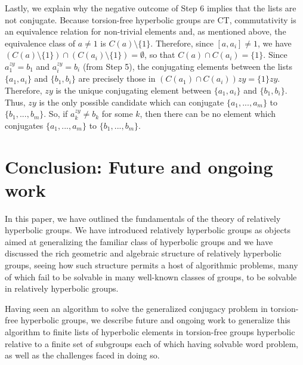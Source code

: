 \documentclass[12pt]{article}
\newcommand{\vs}{\vskip10pt}
\begin{document}
	\vs 
	
	Lastly, we explain why the negative outcome of Step 6 implies that the lists are not conjugate. Because torsion-free hyperbolic groups are CT, commutativity is an equivalence relation for non-trivial elements and, as mentioned above, the equivalence class of $a \neq 1$ is $C(a) \setminus \{1\}$. Therefore, since $[a, a_i] \neq 1$, we have $(C(a) \setminus \{1\}) \cap (C(a_i) \setminus \{1\}) = \emptyset$, so that $C(a) \cap C(a_i) = \{1\}$. Since $a_1^{zy} = b_1$ and $a_i^{zy} = b_i$ (from Step 5), the conjugating elements between the lists $\{a_1, a_i\}$ and $\{b_1, b_i\}$ are precisely those in $(C(a_1) \cap C(a_i))zy = \{1\}zy$. Therefore, $zy$ is the unique conjugating element between $\{a_1, a_i\}$ and $\{b_1, b_i\}$. Thus, $zy$ is the only possible candidate which can conjugate $\{a_1,...,a_m\}$ to $\{b_1,...,b_m\}$. So, if $a_k^{zy} \neq b_k$ for some $k$, then there can be no element which conjugates $\{a_1,...,a_m\}$ to $\{b_1,...,b_m\}$. 
	
	\newpage
	
	\section{Conclusion: Future and ongoing work}
	
	In this paper, we have outlined the fundamentals of the theory of relatively hyperbolic groups. We have introduced relatively hyperbolic groups as objects aimed at generalizing the familiar class of hyperbolic groups and we have discussed the rich geometric and algebraic structure of relatively hyperbolic groups, seeing how such structure permits a host of algorithmic problems, many of which fail to be solvable in many well-known classes of groups, to be solvable in relatively hyperbolic groups. 
	
	\vs 
	
	Having seen an algorithm to solve the generalized conjugacy problem in torsion-free hyperbolic groups, we describe future and ongoing work to generalize this algorithm to finite lists of hyperbolic elements in torsion-free groups hyperbolic relative to a finite set of subgroups each of which having solvable word problem, as well as the challenges faced in doing so. 
	
	\vs 
	
\end{document}
